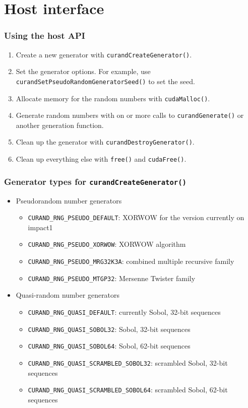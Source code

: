 \documentclass[handout]{beamer}
\numberwithin{equation}{section}
\begin{document}
\section{Host interface}

\begin{frame}
\frametitle{Using the host API}
\begin{enumerate}
\pause \item Create a new generator with {\tt curandCreateGenerator()}.
\pause \item Set the generator options. For example, use {\tt curandSetPseudoRandomGeneratorSeed()} to set the seed.
\pause \item Allocate memory for the random numbers with {\tt cudaMalloc()}.
\pause \item Generate random numbers with on or more calls to {\tt curandGenerate()} or another generation function.
\pause \item Clean up the generator with {\tt curandDestroyGenerator()}.
\pause \item Clean up everything else with {\tt free()} and {\tt cudaFree()}.
\end{enumerate}
\end{frame}

\begin{frame}
\frametitle{Generator types for {\tt curandCreateGenerator()}}
\begin{itemize}
\item Pseudorandom number generators
\begin{itemize}
\pause \item {\tt CURAND\_RNG\_PSEUDO\_DEFAULT}: XORWOW for the version currently on impact1
\pause \item {\tt CURAND\_RNG\_PSEUDO\_XORWOW}: XORWOW algorithm
\pause \item {\tt CURAND\_RNG\_PSEUDO\_MRG32K3A}: combined multiple recursive family
\pause \item {\tt CURAND\_RNG\_PSEUDO\_MTGP32}: Mersenne Twister family
\end{itemize}
\pause \item Quasi-random number generators
\begin{itemize}
\pause \item {\tt CURAND\_RNG\_QUASI\_DEFAULT}: currently Sobol, 32-bit sequences
\pause \item {\tt CURAND\_RNG\_QUASI\_SOBOL32}: Sobol, 32-bit sequences
 \item {\tt CURAND\_RNG\_QUASI\_SOBOL64}: Sobol, 62-bit sequences
\pause \item {\tt CURAND\_RNG\_QUASI\_SCRAMBLED\_SOBOL32}: scrambled Sobol, 32-bit sequences
 \item {\tt CURAND\_RNG\_QUASI\_SCRAMBLED\_SOBOL64}: scrambled Sobol, 62-bit sequences
\end{itemize}
\end{itemize}
\end{frame}
\end{document}
